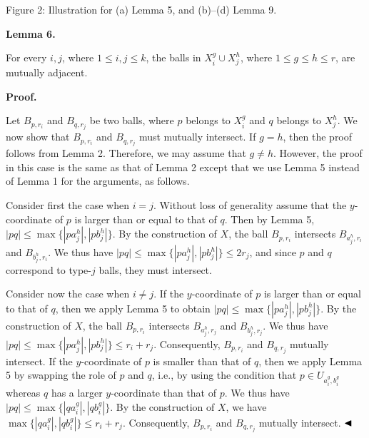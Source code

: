  Figure 2:  Illustration for (a) Lemma 5, and (b)–(d) Lemma 9.   
\par\medskip\noindent\textbf{Lemma 6.}\par
For every $i,j$, where $1\leq i,j\leq k$, the balls in $X^{g}_{i}\cup X^{h}_{j}$, where $1\leq g\leq h\leq r$, are mutually adjacent.
\par
\par
\par
\par
\par\medskip\noindent\textbf{Proof.}\par
Let $B_{p,r_{i}}$ and $B_{q,r_{j}}$ be two balls, where $p$ belongs to $X^{g}_{i}$ and $q$ belongs to $X^{h}_{j}$. We now show that $B_{p,r_{i}}$ and $B_{q,r_{j}}$ must mutually intersect. If $g=h$, then the proof follows from Lemma 2. Therefore, we may assume that $g\not=h$. However, the proof in this case is the same as that of Lemma 2 except that we use Lemma 5 instead of Lemma 1 for the arguments, as follows.
\par
\par
Consider first the case when $i=j$. Without loss of generality assume that the $y$-coordinate of $p$ is larger than or equal to that of $q$. Then by Lemma 5, $|pq|\leq\max\{|pa^{h}_{j}|,|pb^{h}_{j}|\}$. By the construction of $X$, the ball $B_{p,r_{i}}$ intersects $B_{a^{h}_{j},r_{i}}$ and $B_{b^{h}_{j},r_{i}}$. We thus have $|pq|\leq\max\{|pa^{h}_{j}|,|pb^{h}_{j}|\}\leq 2r_{j}$, and since $p$ and $q$ correspond to type-$j$ balls, they must intersect.
\par
\par
Consider now the case when $i\not=j$. If the $y$-coordinate of $p$ is larger than or equal to that of $q$, then we apply Lemma 5 to obtain $|pq|\leq\max\{|pa^{h}_{j}|,|pb^{h}_{j}|\}$. By the construction of $X$, the ball $B_{p,r_{i}}$ intersects $B_{a^{h}_{j},r_{j}}$ and $B_{b^{h}_{j},r_{j}}$. We thus have $|pq|\leq\max\{|pa^{h}_{j}|,|pb^{h}_{j}|\}\leq r_{i}+r_{j}$. Consequently, $B_{p,r_{i}}$ and $B_{q,r_{j}}$ mutually intersect. If the $y$-coordinate of $p$ is smaller than that of $q$, then we apply Lemma 5 by swapping the role of $p$ and $q$, i.e., by using the condition that $p\in U_{a^{g}_{i},b^{g}_{i}}$ whereas $q$ has a larger $y$-coordinate than that of $p$. We thus have $|pq|\leq\max\{|qa^{g}_{i}|,|qb^{g}_{i}|\}$. By the construction of $X$, we have $\max\{|qa^{g}_{i}|,|qb^{g}_{i}|\}\leq r_{i}+r_{j}$. Consequently, $B_{p,r_{i}}$ and $B_{q,r_{j}}$ mutually intersect. $\hfill\blacktriangleleft$
\par
